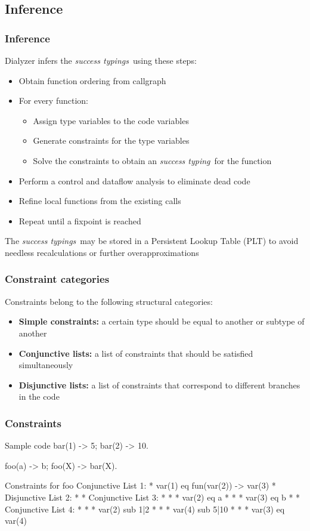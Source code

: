 \documentclass{beamer}
\newcommand{\st}{\emph{success typing}}
\newcommand{\sts}{\emph{success typings}}
\begin{document}
\subsection{Inference}

\begin{frame}
  \frametitle{Inference}
  Dialyzer infers the \sts\ using these steps:
  \begin{itemize}
  \item Obtain function ordering from callgraph \pause
  \item For every function:
    \begin{itemize}
    \item Assign type variables to the code variables
    \item Generate constraints for the type variables
    \item Solve the constraints to obtain an \st\ for the function
    \end{itemize} \pause
  \item Perform a control and dataflow analysis to eliminate dead code \pause
  \item Refine local functions from the existing calls \pause
  \item Repeat until a fixpoint is reached \pause
  \end{itemize}
  The \sts\ may be stored in a Persistent Lookup Table (PLT) to avoid
  needless recalculations or further overapproximations
\end{frame}

\begin{frame}
  \frametitle{Constraint categories}
  Constraints belong to the following structural categories: \pause
  \begin{itemize}
  \item \textbf{Simple constraints:} a certain type should be equal to
    another or subtype of another \pause
  \item \textbf{Conjunctive lists:} a list of constraints that should be
    satisfied simultaneously \pause
  \item \textbf{Disjunctive lists:} a list of constraints that
    correspond to different branches in the code
  \end{itemize}
\end{frame}

\begin{frame}[fragile]
  \frametitle{Constraints}
\begin{code}{Sample code}
bar(1) -> 5;  %
bar(2) -> 10. %

foo(a) -> b;
foo(X) -> bar(X).
\end{code}
\begin{code}{Constraints for foo}
Conjunctive List 1:                %
 * var(1) eq fun(var(2)) -> var(3) %
 * Disjunctive List 2:             %
 *  * Conjunctive List 3:          %
 *  *  * var(2) eq a               %
 *  *  * var(3) eq b               %
 *  * Conjunctive List 4:
 *  *  * var(2) sub 1|2
 *  *  * var(4) sub 5|10
 *  *  * var(3) eq var(4)
\end{code}
\end{frame}
\end{document}
